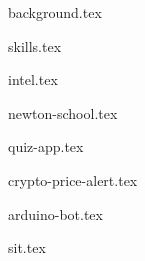 \documentclass[hidelinks,11pt]{article}
\begin{document}

{background.tex}



{skills.tex}



{intel.tex}

{newton-school.tex}



{quiz-app.tex}

{crypto-price-alert.tex}

{arduino-bot.tex}



{sit.tex}
\end{document}

